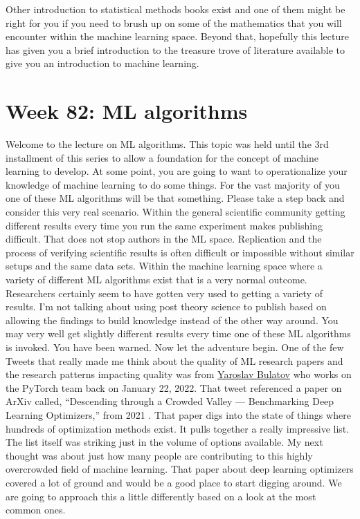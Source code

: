 \documentclass{article}
\begin{document}
Other introduction to statistical methods books exist and one of them might be right for you if you need to brush up on some of the mathematics that you will encounter within the machine learning space. Beyond that, hopefully this lecture has given you a brief introduction to the treasure trove of literature available to give you an introduction to machine learning. 

\section{Week 82: ML algorithms}
Welcome to the lecture on ML algorithms. This topic was held until the 3rd installment of this series to allow a foundation for the concept of machine learning to develop. At some point, you are going to want to operationalize your knowledge of machine learning to do some things. For the vast majority of you one of these ML algorithms will be that something. Please take a step back and consider this very real scenario. Within the general scientific community getting different results every time you run the same experiment makes publishing difficult. That does not stop authors in the ML space. Replication and the process of verifying scientific results is often difficult or impossible without similar setups and the same data sets. Within the machine learning space where a variety of different ML algorithms exist that is a very normal outcome. Researchers certainly seem to have gotten very used to getting a variety of results. I’m not talking about using post theory science to publish based on allowing the findings to build knowledge instead of the other way around. You may very well get slightly different results every time one of these ML algorithms is invoked. You have been warned. Now let the adventure begin. 
One of the few Tweets that really made me think about the quality of ML research papers and the research patterns impacting quality was from \href{https://twitter.com/yaroslavvb/status/1484968489014104065}{Yaroslav Bulatov} who works on the PyTorch team back on January 22, 2022. That tweet referenced a paper on ArXiv called, “Descending through a Crowded Valley — Benchmarking Deep Learning Optimizers,” from 2021 \cite{schmidt2021descending}. That paper digs into the state of things where hundreds of optimization methods exist. It pulls together a really impressive list. The list itself was striking just in the volume of options available. My next thought was about just how many people are contributing to this highly overcrowded field of machine learning. That paper about deep learning optimizers covered a lot of ground and would be a good place to start digging around. We are going to approach this a little differently based on a look at the most common ones. 
\end{document}
